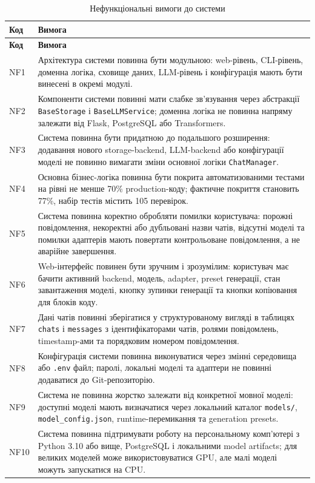 \begin{longtable}{|p{1.5cm}|p{13.5cm}|}
\caption{Нефункціональні вимоги до системи}
\label{tab:non-functional-requirements}\\
\hline
\textbf{Код} & \textbf{Вимога} \\
\hline
\endfirsthead
\hline
\textbf{Код} & \textbf{Вимога} \\
\hline
\endhead
NF1 & Архітектура системи повинна бути модульною: web-рівень, CLI-рівень, доменна логіка, сховище даних, LLM-рівень і конфігурація мають бути винесені в окремі модулі. \\
\hline
NF2 & Компоненти системи повинні мати слабке зв'язування через абстракції \texttt{BaseStorage} і \texttt{BaseLLMService}; доменна логіка не повинна напряму залежати від Flask, PostgreSQL або Transformers. \\
\hline
NF3 & Система повинна бути придатною до подальшого розширення: додавання нового storage-backend, LLM-backend або конфігурації моделі не повинно вимагати зміни основної логіки \texttt{ChatManager}. \\
\hline
NF4 & Основна бізнес-логіка повинна бути покрита автоматизованими тестами на рівні не менше 70\% production-коду; фактичне покриття становить 77\%, набір тестів містить 105 перевірок. \\
\hline
NF5 & Система повинна коректно обробляти помилки користувача: порожні повідомлення, некоректні або дубльовані назви чатів, відсутні моделі та помилки адаптерів мають повертати контрольоване повідомлення, а не аварійне завершення. \\
\hline
NF6 & Web-інтерфейс повинен бути зручним і зрозумілим: користувач має бачити активний backend, модель, adapter, preset генерації, стан завантаження моделі, кнопку зупинки генерації та кнопки копіювання для блоків коду. \\
\hline
NF7 & Дані чатів повинні зберігатися у структурованому вигляді в таблицях \texttt{chats} і \texttt{messages} з ідентифікаторами чатів, ролями повідомлень, timestamp-ами та порядковим номером повідомлення. \\
\hline
NF8 & Конфігурація системи повинна виконуватися через змінні середовища або \texttt{.env} файл; паролі, локальні моделі та адаптери не повинні додаватися до Git-репозиторію. \\
\hline
NF9 & Система не повинна жорстко залежати від конкретної мовної моделі: доступні моделі мають визначатися через локальний каталог \texttt{models/}, \texttt{model\_config.json}, runtime-перемикання та generation presets. \\
\hline
NF10 & Система повинна підтримувати роботу на персональному комп'ютері з Python 3.10 або вище, PostgreSQL і локальними model artifacts; для великих моделей може використовуватися GPU, але малі моделі можуть запускатися на CPU. \\
\hline
\end{longtable}

